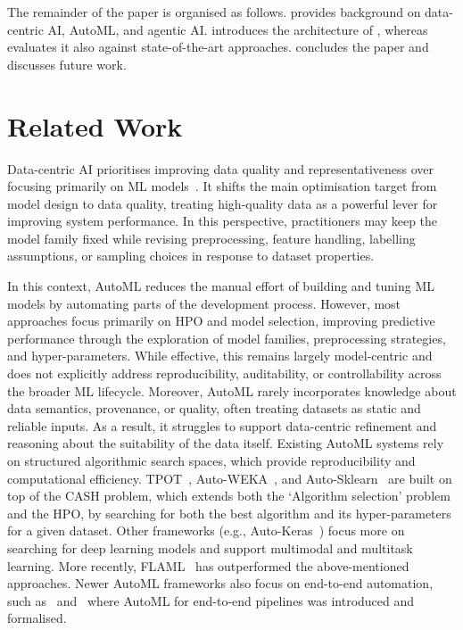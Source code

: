 \documentclass[runningheads]{llncs}
\begin{document}
The remainder of the paper is organised as follows.
 provides background on data-centric \ac{AI}, \ac{AutoML}, and agentic \ac{AI}.
 introduces the architecture of \ourapproach{}, whereas  evaluates it also against state-of-the-art approaches.
 concludes the paper and discusses future work.

\section{Related Work}
\label{sec:background-and-motivation}

Data-centric \ac{AI} prioritises improving data quality and representativeness over focusing primarily on \ac{ML} models~\cite{zha2025data}.
%
It shifts the main optimisation target from model design to data quality,
treating high-quality data as a powerful lever for improving system performance.
%
In this perspective, 
practitioners may keep the model family fixed while revising preprocessing, feature handling, labelling assumptions, or sampling choices in response to dataset properties.

In this context, 
\Ac{AutoML} reduces the manual effort of building and tuning \ac{ML} models by automating parts of the development process.
%
However, 
most approaches focus primarily on \ac{HPO} and model selection,
improving predictive performance through the exploration of model families, preprocessing strategies, and hyper-parameters.
%
While effective, this remains largely model-centric and does not explicitly address reproducibility, auditability, or controllability across the broader \ac{ML} lifecycle.
%
Moreover, 
\ac{AutoML} rarely incorporates knowledge about data semantics, provenance, or quality,
often treating datasets as static and reliable inputs.
%
As a result, 
it struggles to support data-centric refinement and reasoning about the suitability of the data itself.
%
Existing \ac{AutoML} systems rely on structured algorithmic search spaces,
which provide reproducibility and computational efficiency.
%
%
TPOT~\cite{olson2016tpot},
Auto-WEKA~\cite{DBLP:conf/kdd/ThorntonHHL13},
and
Auto-Sklearn~\cite{DBLP:journals/jmlr/FeurerEFLH22}
are built on top of the \ac{CASH} problem,
which extends both the `Algorithm selection' problem
and
the \ac{HPO},
by searching for both the best algorithm and its hyper-parameters for a given dataset.
%
Other frameworks
(e.g., Auto-Keras~\cite{DBLP:conf/kdd/JinSH19})
focus more on searching for deep learning models and support multimodal and multitask learning.
%
More recently,
FLAML~\cite{DBLP:conf/kdd/0001W0Q22} has outperformed the above-mentioned approaches.
%
Newer \ac{AutoML} frameworks also focus on end-to-end automation,
such as~\cite{FranciaGP23} and~\cite{DBLP:conf/pakdd/FranciaGG24}
where \ac{AutoML} for end-to-end pipelines was introduced and formalised.
\end{document}
